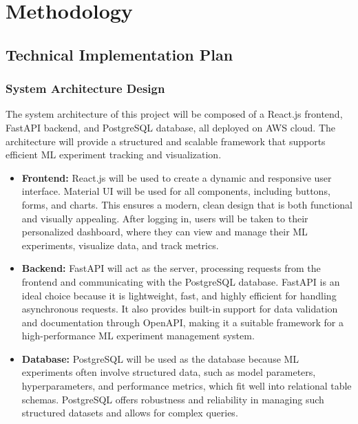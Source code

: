 \documentclass[12pt]{article}
\begin{document}
\section{Methodology}
\subsection{Technical Implementation Plan}

\subsubsection{System Architecture Design}

The system architecture of this project will be composed of a React.js frontend, FastAPI backend, and PostgreSQL database, all deployed on AWS cloud. The architecture will provide a structured and scalable framework that supports efficient ML experiment tracking and visualization.

\begin{itemize}

\item \textbf{Frontend:} React.js will be used to create a dynamic and responsive user interface. Material UI will be used for all components, including buttons, forms, and charts. This ensures a modern, clean design that is both functional and visually appealing. After logging in, users will be taken to their personalized dashboard, where they can view and manage their ML experiments, visualize data, and track metrics.

\item \textbf{Backend:} FastAPI will act as the server, processing requests from the frontend and communicating with the PostgreSQL database. FastAPI is an ideal choice because it is lightweight, fast, and highly efficient for handling asynchronous requests. It also provides built-in support for data validation and documentation through OpenAPI, making it a suitable framework for a high-performance ML experiment management system.

\item \textbf{Database:} PostgreSQL will be used as the database because ML experiments often involve structured data, such as model parameters, hyperparameters, and performance metrics, which fit well into relational table schemas. PostgreSQL offers robustness and reliability in managing such structured datasets and allows for complex queries.

\end{itemize}
\end{document}
